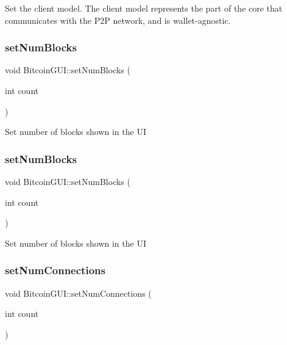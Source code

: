 Set the client model. The client model represents the part of the core that communicates with the P2P network, and is wallet-\/agnostic. \mbox{\label{class_bitcoin_g_u_i_ad9c5016f37aa52562c114527a63a2563}} 
\subsubsection{\texorpdfstring{setNumBlocks}{setNumBlocks}\hspace{0.1cm}{\footnotesize\ttfamily [1/2]}}
{\footnotesize\ttfamily void Bitcoin\+G\+U\+I\+::set\+Num\+Blocks (\begin{DoxyParamCaption}\item[{int}]{count }\end{DoxyParamCaption})\hspace{0.3cm}{\ttfamily [slot]}}

Set number of blocks shown in the UI \mbox{\label{class_bitcoin_g_u_i_ad9c5016f37aa52562c114527a63a2563}} 
\subsubsection{\texorpdfstring{setNumBlocks}{setNumBlocks}\hspace{0.1cm}{\footnotesize\ttfamily [2/2]}}
{\footnotesize\ttfamily void Bitcoin\+G\+U\+I\+::set\+Num\+Blocks (\begin{DoxyParamCaption}\item[{int}]{count }\end{DoxyParamCaption})\hspace{0.3cm}{\ttfamily [slot]}}

Set number of blocks shown in the UI \mbox{\label{class_bitcoin_g_u_i_ae5b9dc62c6a52764a92cfacbe128626f}} 
\subsubsection{\texorpdfstring{setNumConnections}{setNumConnections}\hspace{0.1cm}{\footnotesize\ttfamily [1/2]}}
{\footnotesize\ttfamily void Bitcoin\+G\+U\+I\+::set\+Num\+Connections (\begin{DoxyParamCaption}\item[{int}]{count }\end{DoxyParamCaption})\hspace{0.3cm}{\ttfamily [slot]}}


